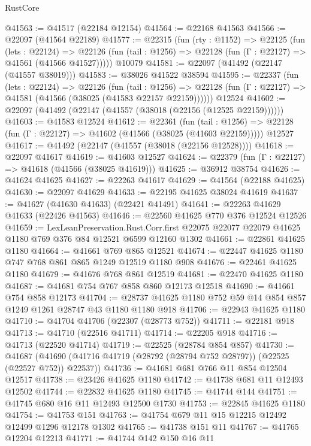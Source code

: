 \begin{lexlean}{RustCore}
\begin{coremodule}
@41563 := @41517 (@22184 @12154)
@41564 := @22168 @41563
@41566 := @22097 (@41564 @22189)
@41577 := @22315
    (fun (rty : @1152) =>
    @22125
      (fun (lets : @22124) =>
      @22126 (fun (tail : @1256) => @22128 (fun (Γ : @22127) => @41561 (@41566 @41527)))))
    @10079
@41581 := @22097 (@41492 (@22147 (@41557 @38019)))
@41583 := @38026 @41522 @38594
@41595 := @22337
    (fun (lets : @22124) =>
    @22126
      (fun (tail : @1256) =>
      @22128 (fun (Γ : @22127) => @41581 (@41566 (@38025 (@41583 @22157 @22159))))))
    @12524
@41602 := @22097 (@41492 (@22147 (@41557 (@38018 (@22156 (@12525 @22159))))))
@41603 := @41583 @12524
@41612 := @22361
    (fun (tail : @1256) => @22128 (fun (Γ : @22127) => @41602 (@41566 (@38025 (@41603 @22159)))))
    @12527
@41617 := @41492 (@22147 (@41557 (@38018 (@22156 @12528))))
@41618 := @22097 @41617
@41619 := @41603 @12527
@41624 := @22379 (fun (Γ : @22127) => @41618 (@41566 (@38025 @41619)))
@41625 := @36912 @38754
@41626 := @41624 @41625
@41627 := @22263 @41617
@41629 := @41564 (@22188 @41625)
@41630 := @22097 @41629
@41633 := @22195 @41625 @38024 @41619
@41637 := @41627 (@41630 @41633) (@22421 @41491)
@41641 := @22263 @41629 @41633 (@22426 @41563)
@41646 := @22560 @41625 @770 @376 @12524 @12526
@41659 := LexLeanPreservation.Rust.Corr.first
    @22075
    @22077
    @22079
    @41625
    @1180
    @769
    @376
    @84
    @12521
    @6599
    @12160
    @1302
@41661 := @22861 @41625 @1180
@41664 := @41661 @769 @865 @12521
@41674 := @22447 @41625 @1180 @747 @768 @861 @865 @1249 @12519 @1180 @908
@41676 := @22461 @41625 @1180
@41679 := @41676 @768 @861 @12519
@41681 := @22470 @41625 @1180
@41687 := @41681 @754 @767 @858 @860 @12173 @12518
@41690 := @41661 @754 @858 @12173
@41704 := @28737 @41625 @1180 @752 @59 @14 @854 @857 @1249 @1261 @28747 @43 @1180 @1180 @918
@41706 := @22943 @41625 @1180
@41710 := @41704 @41706 (@22307 (@28773 @752))
@41711 := @22181 @918
@41713 := @41710 (@22516 @41711)
@41714 := @22205 @918
@41716 := @41713 (@22520 @41714)
@41719 := @22525 (@28784 @854 @857)
@41730 := @41687
    (@41690 (@41716 @41719 (@28792 (@28794 @752 @28797)) (@22525 (@22527 @752)) @22537))
@41736 := @41681 @681 @766 @11 @854 @12504 @12517
@41738 := @23426 @41625 @1180
@41742 := @41738 @681 @11 @12493 @12502
@41744 := @22832 @41625 @1180
@41745 := @41744 @144
@41751 := @41745 @680 @16 @11 @12493 @12500 @1730
@41753 := @22845 @41625 @1180
@41754 := @41753 @151
@41763 := @41754 @679 @11 @15 @12215 @12492 @12499 @1296 @12178 @1302
@41765 := @41738 @151 @11
@41767 := @41765 @12204 @12213
@41771 := @41744 @142 @150 @16 @11

\end{coremodule}
\end{lexlean}
